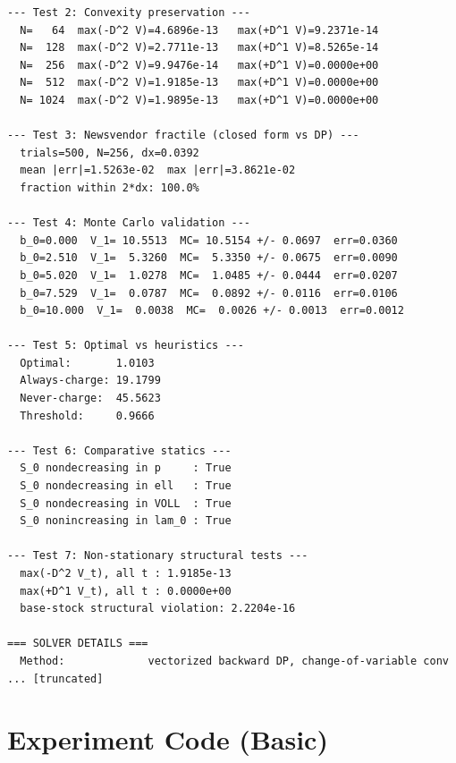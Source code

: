 \documentclass[11pt]{article}
\begin{document}
\begin{lstlisting}
--- Test 2: Convexity preservation ---
  N=   64  max(-D^2 V)=4.6896e-13   max(+D^1 V)=9.2371e-14
  N=  128  max(-D^2 V)=2.7711e-13   max(+D^1 V)=8.5265e-14
  N=  256  max(-D^2 V)=9.9476e-14   max(+D^1 V)=0.0000e+00
  N=  512  max(-D^2 V)=1.9185e-13   max(+D^1 V)=0.0000e+00
  N= 1024  max(-D^2 V)=1.9895e-13   max(+D^1 V)=0.0000e+00

--- Test 3: Newsvendor fractile (closed form vs DP) ---
  trials=500, N=256, dx=0.0392
  mean |err|=1.5263e-02  max |err|=3.8621e-02
  fraction within 2*dx: 100.0%

--- Test 4: Monte Carlo validation ---
  b_0=0.000  V_1= 10.5513  MC= 10.5154 +/- 0.0697  err=0.0360
  b_0=2.510  V_1=  5.3260  MC=  5.3350 +/- 0.0675  err=0.0090
  b_0=5.020  V_1=  1.0278  MC=  1.0485 +/- 0.0444  err=0.0207
  b_0=7.529  V_1=  0.0787  MC=  0.0892 +/- 0.0116  err=0.0106
  b_0=10.000  V_1=  0.0038  MC=  0.0026 +/- 0.0013  err=0.0012

--- Test 5: Optimal vs heuristics ---
  Optimal:       1.0103
  Always-charge: 19.1799
  Never-charge:  45.5623
  Threshold:     0.9666

--- Test 6: Comparative statics ---
  S_0 nondecreasing in p     : True
  S_0 nondecreasing in ell   : True
  S_0 nondecreasing in VOLL  : True
  S_0 nonincreasing in lam_0 : True

--- Test 7: Non-stationary structural tests ---
  max(-D^2 V_t), all t : 1.9185e-13
  max(+D^1 V_t), all t : 0.0000e+00
  base-stock structural violation: 2.2204e-16

=== SOLVER DETAILS ===
  Method:             vectorized backward DP, change-of-variable conv
... [truncated]
\end{lstlisting}


\section{Experiment Code (Basic)}
\end{document}
